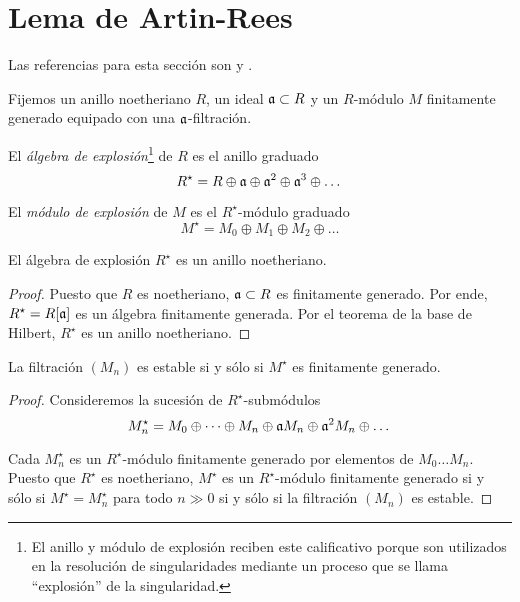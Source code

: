 \section{Lema de Artin-Rees}

\noindent Las referencias para esta sección son \cite[p. 107]{atiyah} y \cite[pp. 148-149]{eisenbud}.

\begin{preliminaries}
Fijemos un anillo noetheriano $R$, un ideal $\mathfrak a \subset R$ y un $R$-módulo $M$ finitamente generado equipado con una $\mathfrak a$-filtración.
\end{preliminaries}

\begin{definition}
El \textit{álgebra de explosión}\footnote{El anillo y módulo de explosión reciben este calificativo porque son utilizados en la resolución de singularidades mediante un proceso que se llama ``explosión'' de la singularidad.} de $R$ es el anillo graduado
$$R^\star = R \oplus \mathfrak a \oplus \mathfrak a^2 \oplus \mathfrak a^3 \oplus \dots$$
\end{definition}

\begin{definition}
El \textit{módulo de explosión} de $M$ es el $R^\star$-módulo graduado
$$M^\star = M_0 \oplus M_1 \oplus M_2 \oplus \dots$$
\end{definition}

\begin{proposition}
El álgebra de explosión $R^\star$ es un anillo noetheriano.
\end{proposition}

\begin{proof}
Puesto que $R$ es noetheriano, $\mathfrak a \subset R$ es finitamente generado. Por ende, $R^\star = R[\mathfrak a]$ es un álgebra finitamente generada. Por el teorema de la base de Hilbert, $R^\star$ es un anillo noetheriano.
\end{proof}

\begin{proposition}
La filtración $(M_n)$ es estable si y sólo si $M^\star$ es finitamente generado.
\end{proposition}

\begin{proof}
Consideremos la sucesión de $R^\star$-submódulos
$$M_n^\star = M_0 \oplus \dots \oplus M_n \oplus \mathfrak a M_n \oplus \mathfrak a^2 M_n \oplus \dots$$

Cada $M_n^\star$ es un $R^\star$-módulo finitamente generado por elementos de $M_0 \dots M_n$. Puesto que $R^\star$ es noetheriano, $M^\star$ es un $R^\star$-módulo finitamente generado si y sólo si $M^\star = M_n^\star$ para todo $n \gg 0$ si y sólo si la filtración $(M_n)$ es estable.
\end{proof}

